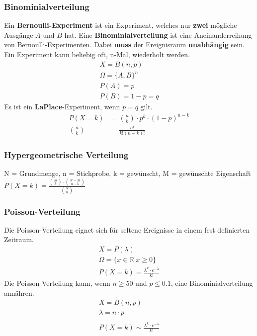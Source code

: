 \documentclass[a4paper, 10pt, landscape]{article}
\begin{document}
\begin{multicols}{5}
\begin{small}
			\subsubsection{Binominialverteilung}
			    Ein \textbf{Bernoulli-Experiment} ist ein Experiment, welches nur \textbf{zwei} mögliche Ausgänge $A$ und $B$ hat. Eine \textbf{Binominialverteilung} ist eine Aneinanderreihung von Bernoulli-Experimenten. Dabei \textbf{muss} der Ereignisraum \textbf{unabhängig} sein. Ein Experiment kann beliebig oft, n-Mal, wiederholt werden.
				\begin{align*}
					X = B(n, p)\\
					\Omega = \{A, B\}^n\\
					P(A) = p\\
					P(B) = 1 - p = q
				\end{align*}
	    		Es ist ein \textbf{LaPlace}-Experiment, wenn $p = q$ gilt.
			    \begin{align*}
				    P(X = k) &= {n \choose k} \cdot p^k \cdot (1-p)^{n-k}\\
				    {n \choose k} &= \frac{n!}{k! (n-k)!}
			    \end{align*}
			\subsubsection{Hypergeometrische Verteilung}
				N = Grundmenge, n = Stichprobe, k = gewünscht, M = gewünschte Eigenschaft\\
					$P(X = k) = \frac{{M \choose k} \cdot {N - M \choose n - k}}{{N \choose n}}$
		    \subsubsection{Poisson-Verteilung}
			    Die Poisson-Verteilung eignet sich für seltene Ereignisse in einem fest definierten Zeitraum.
			    \begin{align*}
				    X = P(\lambda)\\
				    \Omega = \{x \in \mathbb{R} | x \geq 0\}\\
				    P(X = k) = \frac{\lambda^k \cdot e^{-\lambda}}{k!}	
			    \end{align*}
			    Die Poisson-Verteilung kann, wenn $n \ge 50$ und $p \leq 0.1$, eine Binominialverteilung annähren.
			    \begin{align*}
				    X = B(n, p) \\
				    \lambda = n \cdot p \\\\
				    P(X = k) \sim \frac{\lambda^k \cdot e^{-\lambda}}{k!}	
			    \end{align*}

\end{small}
\end{multicols}
\end{document}

